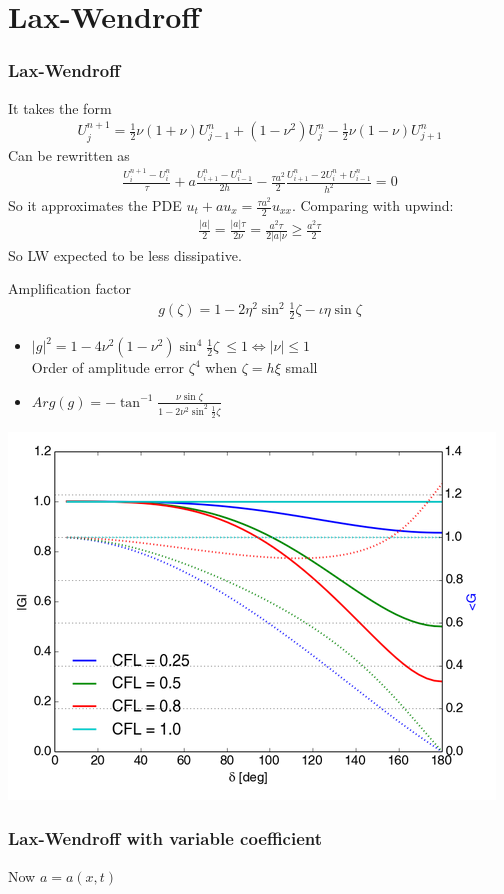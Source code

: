 \documentclass{beamer}
\begin{document}
\section{Lax-Wendroff}
\begin{frame}
\frametitle{Lax-Wendroff}
It takes the form
\begin{align*}
U_j^{n+1} = \frac{1}{2}\nu(1 + \nu)U_{j-1}^n + (1 - \nu^2)U_j^n - \frac{1}{2}\nu(1 - \nu)U_{j+1}^n
\end{align*}
Can be rewritten as 
\begin{align*}
\frac{U_i^{n+1} - U_i^n}{\tau} + a \frac{U_{i+1}^n - U_{i-1}^n}{2h} - \frac{\tau a^2}{2}\frac{U_{i+1}^n -2U_i^n + U_{i-1}^n}{h^2} = 0
\end{align*}
So it approximates the PDE $u_t + au_x = \frac{\tau a^2}{2}u_{xx}$. Comparing with upwind:
\begin{align*}
\frac{|a|}{2} = \frac{|a|\tau}{2 \nu} = \frac{a^2 \tau}{2 |a| \nu} \geq \frac{a^2 \tau}{2}
\end{align*}
So LW expected to be less dissipative.
\end{frame}
\begin{frame}
Amplification factor
\begin{align*}
g(\zeta) = 1 - 2 \eta^2\sin^2{\frac{1}{2}\zeta} - \iota \eta \sin{\zeta}
\end{align*}
\begin{itemize}
\setlength\itemsep{1em}
\item $|g|^2 = 1 - 4\nu^2(1-\nu^2)\sin^4{\frac{1}{2}\zeta} \ \leq 1 \iff |\nu| \leq 1$ \\ Order of amplitude error $\zeta^4$ when $\zeta = h\xi$ small
\item $Arg(g) = \displaystyle{-\tan^{-1}{\frac{\nu \sin{\zeta}}{1 - 2\nu^2\sin^2{\frac{1}{2}\zeta}}}}$
\end{itemize}
\end{frame}
\begin{frame}
\includegraphics[width=\textwidth]{lw_g}
\end{frame}
\begin{frame}
\frametitle{Lax-Wendroff with variable coefficient}
Now $a = a(x,t)$
\end{frame}
\end{document}
